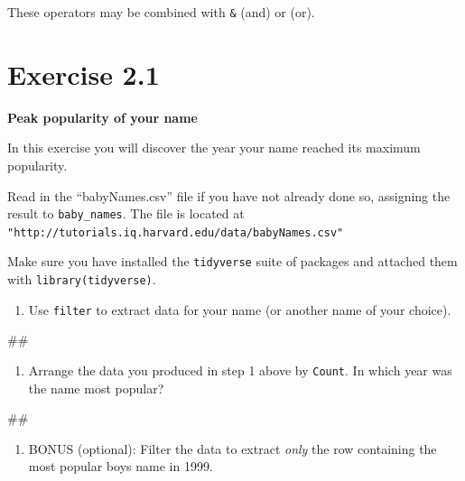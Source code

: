 \documentclass[]{book}
\newenvironment{Shaded}{\begin{snugshade}}{\end{snugshade}}
\newcommand{\NormalTok}[1]{#1}
\providecommand{\tightlist}{%
  \setlength{\itemsep}{0pt}\setlength{\parskip}{0pt}}
\begin{document}
These operators may be combined with \texttt{\&} (and) or
\texttt{\textbar{}} (or).

\section{Exercise 2.1}\label{exercise-2.1}

\textbf{Peak popularity of your name}

In this exercise you will discover the year your name reached its
maximum popularity.

Read in the ``babyNames.csv'' file if you have not already done so,
assigning the result to \texttt{baby\_names}. The file is located at
\texttt{"http://tutorials.iq.harvard.edu/data/babyNames.csv"}

Make sure you have installed the \texttt{tidyverse} suite of packages
and attached them with \texttt{library(tidyverse)}.

\begin{enumerate}
\def\labelenumi{\arabic{enumi}.}
\tightlist
\item
  Use \texttt{filter} to extract data for your name (or another name of
  your choice).
\end{enumerate}

\begin{Shaded}
\begin{Highlighting}[]
\NormalTok{##}
\end{Highlighting}
\end{Shaded}

\begin{enumerate}
\def\labelenumi{\arabic{enumi}.}
\setcounter{enumi}{1}
\tightlist
\item
  Arrange the data you produced in step 1 above by \texttt{Count}. In
  which year was the name most popular?
\end{enumerate}

\begin{Shaded}
\begin{Highlighting}[]
\NormalTok{##}
\end{Highlighting}
\end{Shaded}

\begin{enumerate}
\def\labelenumi{\arabic{enumi}.}
\setcounter{enumi}{2}
\tightlist
\item
  BONUS (optional): Filter the data to extract \emph{only} the row
  containing the most popular boys name in 1999.
\end{enumerate}
\end{document}
